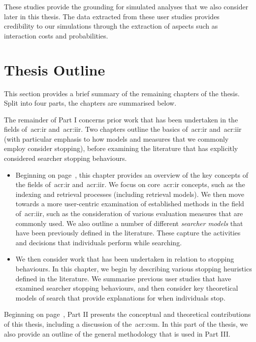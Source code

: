 These studies provide the grounding for simulated analyses that we also consider later in this thesis. The data extracted from these user studies provides credibility to our simulations through the extraction of aspects such as interaction costs and probabilities.

\section{Thesis Outline}
This section provides a brief summary of the remaining chapters of the thesis. Split into four parts, the chapters are summarised below.

\noindent
{}
The remainder of Part I concerns prior work that has been undertaken in the fields of~\gls{acr:ir} and~\gls{acr:iir}. Two chapters outline the basics of~\gls{acr:ir} and~\gls{acr:iir} (with particular emphasis to how models and measures that we commonly employ consider stopping), before examining the literature that has explicitly considered searcher stopping behaviours.

\begin{itemize}
    \item[]{} Beginning on page~\pageref{chap:ir_background}, this chapter provides an overview of the key concepts of the fields of~\gls{acr:ir} and~\gls{acr:iir}. We focus on core~\gls{acr:ir} concepts, such as the indexing and retrieval processes (including retrieval models). We then move towards a more user-centric examination of established methods in the field of~\gls{acr:iir}, such as the consideration of various evaluation measures that are commonly used. We also outline a number of different \emph{searcher models} that have been previously defined in the literature. These capture the activities and decisions that individuals perform while searching.
    
    \item[]{} We then consider work that has been undertaken in relation to stopping behaviours. In this chapter, we begin by describing various stopping heuristics defined in the literature. We summarise previous user studies that have examined searcher stopping behaviours, and then consider key theoretical models of search that provide explanations for when individuals stop.
\end{itemize}

\noindent
{} Beginning on page~\pageref{part:stopping}, Part II presents the conceptual and theoretical contributions of this thesis, including a discussion of the~\gls{acr:csm}. In this part of the thesis, we also provide an outline of the general methodology that is used in Part III.

